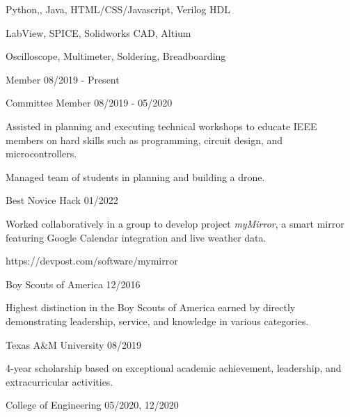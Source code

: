 \documentclass[11pt]{article}
\begin{document}

      {Python,\CPP, Java, HTML/CSS/Javascript, Verilog HDL}

      {LabView, SPICE, Solidworks CAD, Altium}

      {Oscilloscope, Multimeter, Soldering, Breadboarding}


\begin{description}
\squish
{}
           {Member}
           {08/2019 - Present}

           {Committee Member}
           {08/2019 - 05/2020}

Assisted in planning and executing technical workshops to educate IEEE members on hard skills
such as programming, circuit design, and microcontrollers.

Managed team of students in planning and building a drone.

           {Best Novice Hack}
           {01/2022}

Worked collaboratively in a group to develop project \emph{myMirror}, a smart mirror featuring
Google Calendar integration and live weather data.

https://devpost.com/software/mymirror

\end{description}


\begin{description}
\squish
{}
           {Boy Scouts of America}
           {12/2016}

Highest distinction in the Boy Scouts of America earned by directly demonstrating
leadership, service, and knowledge in various categories.

           {Texas A\&M University}
           {08/2019}

4-year scholarship based on exceptional academic achievement, leadership, and extracurricular activities.

           {College of Engineering}
           {05/2020, 12/2020}

\end{description}
\end{document}
